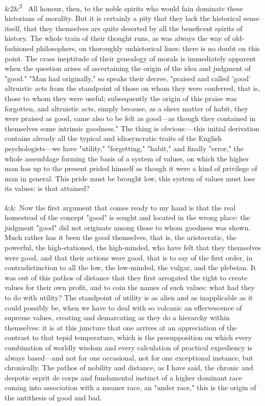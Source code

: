 \documentclass[12pt]{article}
\newcommand{\para}[1][]{\par\noindent\ifx&#1&\else\textsuperscript{\footnotesize #1}~\fi}
\begin{document}
\para[2] All honour, then, to the noble spirits who would fain dominate these historians of morality. But it is certainly a pity that they lack the historical sense itself, that they themselves are quite deserted by all the beneficent spirits of history. The whole train of their thought runs, as was always the way of old-fashioned philosophers, on thoroughly unhistorical lines: there is no doubt on this point. The crass ineptitude of their genealogy of morals is immediately apparent when the question arises of ascertaining the origin of the idea and judgment of "good." "Man had originally," so speaks their decree, "praised and called 'good' altruistic acts from the standpoint of those on whom they were conferred, that is, those to whom they were useful; subsequently the origin of this praise was forgotten, and altruistic acts, simply because, as a sheer matter of habit, they were praised as good, came also to be felt as good---as though they contained in themselves some intrinsic goodness." The thing is obvious:---this initial derivation contains already all the typical and idiosyncratic traits of the English psychologists---we have "utility," "forgetting," "habit," and finally "error," the whole assemblage forming the basis of a system of values, on which the higher man has up to the present prided himself as though it were a kind of privilege of man in general. This pride must be brought low, this system of values must lose its values: is that attained?

\para Now the first argument that comes ready to my hand is that the real homestead of the concept "good" is sought and located in the wrong place: the judgment "good" did not originate among those to whom goodness was shown. Much rather has it been the good themselves, that is, the aristocratic, the powerful, the high-stationed, the high-minded, who have felt that they themselves were good, and that their actions were good, that is to say of the first order, in contradistinction to all the low, the low-minded, the vulgar, and the plebeian. It was out of this pathos of distance that they first arrogated the right to create values for their own profit, and to coin the names of such values: what had they to do with utility? The standpoint of utility is as alien and as inapplicable as it could possibly be, when we have to deal with so volcanic an effervescence of supreme values, creating and demarcating as they do a hierarchy within themselves: it is at this juncture that one arrives at an appreciation of the contrast to that tepid temperature, which is the presupposition on which every combination of worldly wisdom and every calculation of practical expediency is always based---and not for one occasional, not for one exceptional instance, but chronically. The pathos of nobility and distance, as I have said, the chronic and despotic esprit de corps and fundamental instinct of a higher dominant race coming into association with a meaner race, an "under race," this is the origin of the antithesis of good and bad.
\end{document}
